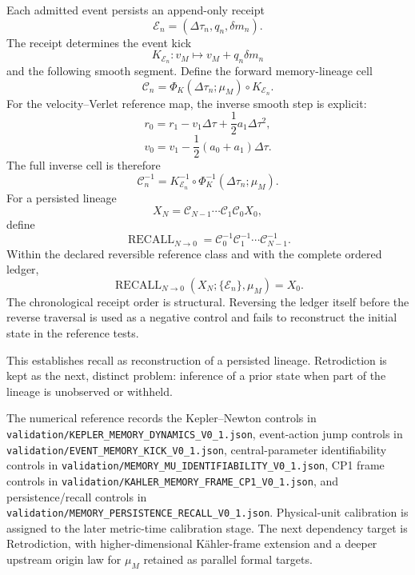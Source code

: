 Each admitted event persists an append-only receipt
\[
\boxed{
\mathcal E_n=(\Delta\tau_n,q_n,\delta m_n).
}
\]
The receipt determines the event kick
\[
K_{\mathcal E_n}:v_M\mapsto v_M+q_n\delta m_n
\]
and the following smooth segment. Define the forward memory-lineage cell
\[
\boxed{
\mathcal C_n
=\Phi_K(\Delta\tau_n;\mu_M)\circ K_{\mathcal E_n}.
}
\]
For the velocity--Verlet reference map, the inverse smooth step is explicit:
\[
\boxed{
r_0=r_1-v_1\Delta\tau+\frac12a_1\Delta\tau^2,
}
\]
\[
\boxed{
v_0=v_1-\frac12(a_0+a_1)\Delta\tau.
}
\]
The full inverse cell is therefore
\[
\boxed{
\mathcal C_n^{-1}
=K_{\mathcal E_n}^{-1}\circ\Phi_K^{-1}(\Delta\tau_n;\mu_M).
}
\]
For a persisted lineage
\[
X_N=\mathcal C_{N-1}\cdots\mathcal C_1\mathcal C_0X_0,
\]
define
\[
\boxed{
\operatorname{RECALL}_{N\to0}
=\mathcal C_0^{-1}\mathcal C_1^{-1}\cdots\mathcal C_{N-1}^{-1}.
}
\]
Within the declared reversible reference class and with the complete ordered ledger,
\[
\boxed{
\operatorname{RECALL}_{N\to0}(X_N;\{\mathcal E_n\},\mu_M)=X_0.
}
\]
The chronological receipt order is structural. Reversing the ledger itself before the reverse traversal is used as a negative control and fails to reconstruct the initial state in the reference tests.

This establishes recall as reconstruction of a persisted lineage. Retrodiction is kept as the next, distinct problem: inference of a prior state when part of the lineage is unobserved or withheld.

The numerical reference records the Kepler--Newton controls in \texttt{validation/KEPLER\_MEMORY\_DYNAMICS\_V0\_1.json}, event-action jump controls in \texttt{validation/EVENT\_MEMORY\_KICK\_V0\_1.json}, central-parameter identifiability controls in \texttt{validation/MEMORY\_MU\_IDENTIFIABILITY\_V0\_1.json}, CP1 frame controls in \texttt{validation/KAHLER\_MEMORY\_FRAME\_CP1\_V0\_1.json}, and persistence/recall controls in \texttt{validation/MEMORY\_PERSISTENCE\_RECALL\_V0\_1.json}. Physical-unit calibration is assigned to the later metric-time calibration stage. The next dependency target is Retrodiction, with higher-dimensional K\"ahler-frame extension and a deeper upstream origin law for \(\mu_M\) retained as parallel formal targets.
